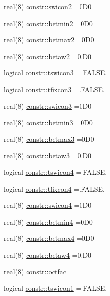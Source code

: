 \begin{DoxyCompactItemize}
real(8) \hyperlink{namespaceconstr_a0206f7a3b7b30d7f3823f15aba53bae8}{constr\+::swicon2} =0\+D0
\item 
real(8) \hyperlink{namespaceconstr_a36044d647f87781b963f69603cbf8d81}{constr\+::betmin2} =0\+D0
\item 
real(8) \hyperlink{namespaceconstr_aa1746615301e6c7db864892b4a4efcae}{constr\+::betmax2} =0\+D0
\item 
real(8) \hyperlink{namespaceconstr_add6480c3e1f2dfa1411754faf59a988f}{constr\+::betaw2} =0.\+D0
\item 
logical \hyperlink{namespaceconstr_ae840dc6cddba77231ae81c49cb9dd28f}{constr\+::tswicon3} =.F\+A\+L\+S\+E.
\item 
logical \hyperlink{namespaceconstr_ad17bca6891f805ef6cc0596067dfd473}{constr\+::tfixcon3} =.F\+A\+L\+S\+E.
\item 
real(8) \hyperlink{namespaceconstr_ae14b0fb5921536040dba512c7afc82fb}{constr\+::swicon3} =0\+D0
\item 
real(8) \hyperlink{namespaceconstr_a06b6dd91134ff376e8cff0d3bc21d6e2}{constr\+::betmin3} =0\+D0
\item 
real(8) \hyperlink{namespaceconstr_abb4b139e7e590c9745b1c81dc1f2ea63}{constr\+::betmax3} =0\+D0
\item 
real(8) \hyperlink{namespaceconstr_a6c448dea7ffa364b53159d44dab6caaf}{constr\+::betaw3} =0.\+D0
\item 
logical \hyperlink{namespaceconstr_a3625f889e5dc6a042f3200449baa08fd}{constr\+::tswicon4} =.F\+A\+L\+S\+E.
\item 
logical \hyperlink{namespaceconstr_a92c73883617275646fba95ec0731601e}{constr\+::tfixcon4} =.F\+A\+L\+S\+E.
\item 
real(8) \hyperlink{namespaceconstr_aa5697aee92cd101480fe1d582d420289}{constr\+::swicon4} =0\+D0
\item 
real(8) \hyperlink{namespaceconstr_a31827347e570a426bd60373f2ef8c219}{constr\+::betmin4} =0\+D0
\item 
real(8) \hyperlink{namespaceconstr_a97294754aa9f8b191ccfc286e1368c33}{constr\+::betmax4} =0\+D0
\item 
real(8) \hyperlink{namespaceconstr_a714dc0ad37c80c778012223401f2f890}{constr\+::betaw4} =0.\+D0
\item 
real(8) \hyperlink{namespaceconstr_ac9a89b946b5604c6179d3be893ab8809}{constr\+::octfac}
\item 
logical \hyperlink{namespaceconstr_a846dedd280a36badad283ce9ad5e8ff0}{constr\+::tswicon1} =.F\+A\+L\+S\+E.
\item 

\end{DoxyCompactItemize}
